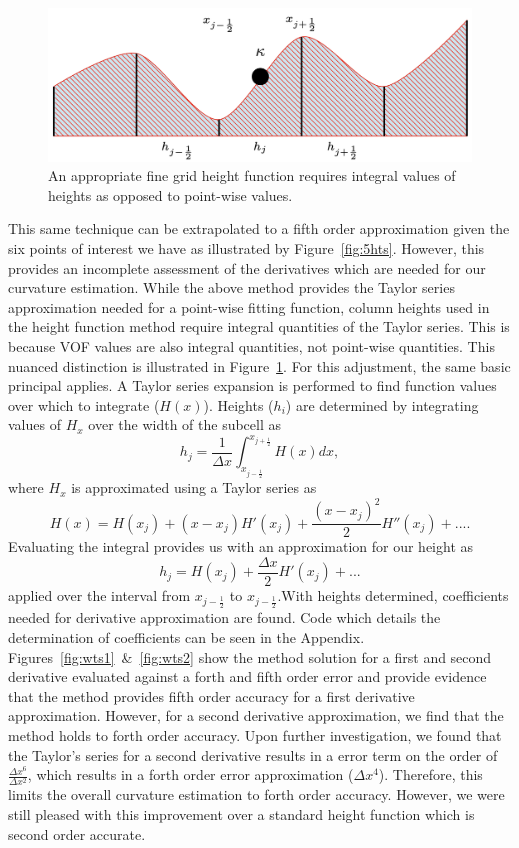 \begin{figure}[htbp]
	\centering
	\includegraphics[width=0.75\linewidth]{figs/properhts.png}
	\caption{An appropriate fine grid height function requires integral values of heights as opposed to point-wise values.}
	\label{fig:int}
\end{figure}
This same technique can be extrapolated to a fifth order approximation given the six points of interest we have as illustrated by Figure~\ref{fig:5hts}. However, this provides an incomplete assessment of the derivatives which are needed for our curvature estimation. While the above method provides the Taylor series approximation needed for a point-wise fitting function, column heights used in the height function method require integral quantities of the Taylor series. This is because VOF values are also integral quantities, not point-wise quantities. This nuanced distinction is illustrated in Figure~\ref{fig:int}. For this adjustment, the same basic principal applies. A Taylor series expansion is performed to find function values over which to integrate ($H(x)$). Heights ($h_i$) are determined by integrating values of $H_x$ over the width of the subcell as \begin{equation}
h_j = \frac{1}{\Delta x}\int^{x_{j+\frac{1}{2}}}_{x_{j-\frac{1}{2}}} H(x)dx,
\label{eqn:int}
\end{equation} 
where $H_x$ is approximated using a Taylor series as 
\begin{equation}
H(x) = H(x_j) + (x-x_j)H'(x_j) + \frac{ (x-x_j)^2}{2} H''(x_j) + ... .
\end{equation}
Evaluating the integral provides us with an approximation for our height as 
\begin{equation}
h_j = H(x_j) + \frac{ \Delta x }{2} H'(x_j) + ...
\end{equation}
 applied over the interval from ${x_{j-\frac{1}{2}}}$ to ${x_{j-\frac{1}{2}}}$.With heights determined, coefficients needed for derivative approximation are found. Code which details the determination of coefficients can be seen in the Appendix. Figures~\ref{fig:wts1}~\&~\ref{fig:wts2} show the method solution for a first and second derivative evaluated against a forth and fifth order error and provide evidence that the method provides fifth order accuracy for a first derivative approximation. However, for a second derivative approximation, we find that the method holds to forth order accuracy.  Upon further investigation, we found that the Taylor's series for a second derivative results in a error term on the order of $\frac{\Delta x^6}{\Delta x^2}$, which results in a forth order error approximation ($\Delta x^4$). Therefore, this limits the overall curvature estimation to forth order accuracy. However, we were still pleased with this improvement over a standard height function which is second order accurate.
